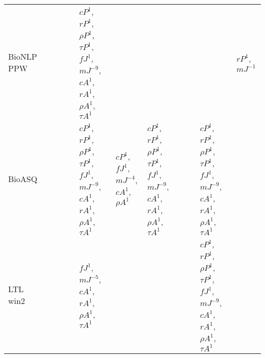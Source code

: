 \documentclass[letterpaper]{article} %
\begin{document}
\begin{sidewaystable*}
\begin{tabular}{l l l l l l l l l l l l}
\midrule
\multirow{6}{1.5cm}{BioNLP PPW} & \multirow{6}{1.5cm}{} & \multirow{6}{1.5cm}{} & \multirow{6}{1.5cm}{} & \multirow{6}{1.5cm}{} & \multirow{6}{1.5cm}{$cP^{1}$, $r P^{1}$, $\rho P^{1}$, $\tau P^{1}$, $fJ^{1}$, $mJ^{-9}$, $cA^{1}$, $r A^{1}$, $\rho A^{1}$, $\tau A^{1}$} & \multirow{6}{1.5cm}{} & \multirow{6}{1.5cm}{} & \multirow{6}{1.5cm}{} & \multirow{6}{1.5cm}{} & \multirow{6}{1.5cm}{} & \multirow{6}{1.5cm}{$r P^{1}$, $mJ^{-1}$} \\ \\ \\ \\ \\ \\
\midrule
\multirow{6}{1.5cm}{BioASQ} & \multirow{6}{1.5cm}{} & \multirow{6}{1.5cm}{} & \multirow{6}{1.5cm}{} & \multirow{6}{1.5cm}{} & \multirow{6}{1.5cm}{$cP^{1}$, $r P^{1}$, $\rho P^{1}$, $\tau P^{1}$, $fJ^{1}$, $mJ^{-9}$, $cA^{1}$, $r A^{1}$, $\rho A^{1}$, $\tau A^{1}$} & \multirow{6}{1.5cm}{$cP^{1}$, $fJ^{1}$, $mJ^{-4}$, $cA^{1}$, $\rho A^{1}$} & \multirow{6}{1.5cm}{$cP^{1}$, $r P^{1}$, $\rho P^{1}$, $\tau P^{1}$, $fJ^{1}$, $mJ^{-9}$, $cA^{1}$, $r A^{1}$, $\rho A^{1}$, $\tau A^{1}$} & \multirow{6}{1.5cm}{} & \multirow{6}{1.5cm}{} & \multirow{6}{1.5cm}{$cP^{1}$, $r P^{1}$, $\rho P^{1}$, $\tau P^{1}$, $fJ^{1}$, $mJ^{-9}$, $cA^{1}$, $r A^{1}$, $\rho A^{1}$, $\tau A^{1}$} & \multirow{6}{1.5cm}{} \\ \\ \\ \\ \\ \\
\midrule
\multirow{6}{1.5cm}{LTL win2} & \multirow{6}{1.5cm}{} & \multirow{6}{1.5cm}{} & \multirow{6}{1.5cm}{} & \multirow{6}{1.5cm}{} & \multirow{6}{1.5cm}{$fJ^{1}$, $mJ^{-5}$, $cA^{1}$, $r A^{1}$, $\rho A^{1}$, $\tau A^{1}$} & \multirow{6}{1.5cm}{} & \multirow{6}{1.5cm}{} & \multirow{6}{1.5cm}{} & \multirow{6}{1.5cm}{} & \multirow{6}{1.5cm}{$cP^{1}$, $r P^{1}$, $\rho P^{1}$, $\tau P^{1}$, $fJ^{1}$, $mJ^{-9}$, $cA^{1}$, $r A^{1}$, $\rho A^{1}$, $\tau A^{1}$} & \multirow{6}{1.5cm}{} \\ \\ \\ \\ \\ \\
\midrule

\end{tabular}
\end{sidewaystable*}
\end{document}
